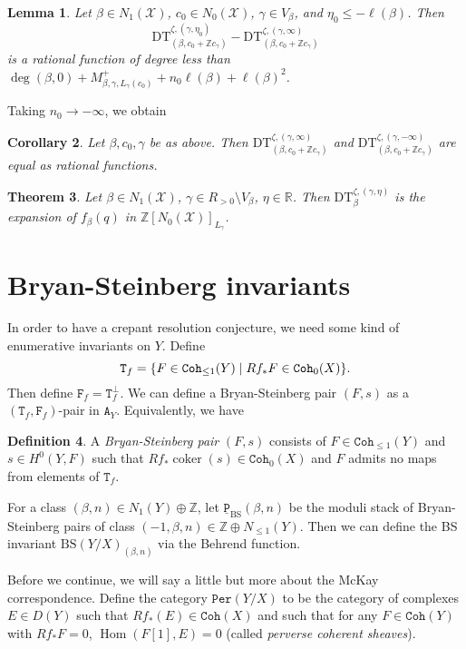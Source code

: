 \documentclass{amsart}
\newtheorem{thm}{Theorem}[section]
\newtheorem{cor}[thm]{Corollary}
\newtheorem{lem}[thm]{Lemma}
\theoremstyle{definition}
\newtheorem{defn}[thm]{Definition}
\theoremstyle{remark}
\theoremstyle{plain}
\theoremstyle{definition}
\theoremstyle{remark}
\newcommand{\R}{\mathbb{R}}
\newcommand{\Z}{\mathbb{Z}}
\newcommand{\mc}[1]{\mathcal{#1}}
\newcommand{\mr}[1]{\mathrm{#1}}
\newcommand{\on}[1]{\operatorname{#1}}
\newcommand{\mt}[1]{\mathtt{#1}}
\newcommand{\ul}[1]{\underline{#1}}
\newcommand{\1}{\mathbf{1}}
\newcommand{\2}{\mathbf{2}}
\newcommand{\3}{\mathbf{3}}
\DeclareMathOperator{\Hom}{Hom}
\begin{document}
\begin{lem}
    Let $\beta \in N_1(\mc{X})$, $c_0 \in N_0(\mc{X})$, $\gamma \in V_{\beta}$, and $\eta_0 \leq -\ell(\beta)$. Then
    \[ \mr{DT}_{(\beta, c_0 + \Z c_{\gamma})}^{\zeta, (\gamma, \eta_0)} - \mr{DT}_{(\beta, c_0 + \Z c_{\gamma})}^{\zeta, (\gamma, \infty)} \]
    is a rational function of degree less than $\deg(\beta, 0) + M_{\beta, \gamma, L_{\gamma}(c_0)}^+ + n_0 \ell(\beta) + \ell(\beta)^2$.
\end{lem}
Taking $n_0 \to -\infty$, we obtain
\begin{cor}
    Let $\beta, c_0, \gamma$ be as above. Then $\mr{DT}_{(\beta, c_0 + \Z c_{\gamma})}^{\zeta, (\gamma, \infty)}$ and $\mr{DT}_{(\beta, c_0 + \Z c_{\gamma})}^{\zeta, (\gamma, -\infty)}$ are equal as rational functions.
\end{cor}

\begin{thm}
    Let $\beta \in N_1(\mc{X})$, $\gamma \in R_{>0} \setminus V_{\beta}$, $\eta \in \R$. Then $\mr{DT}_{\beta}^{\zeta, (\gamma, \eta)}$ is the expansion of $f_{\beta}(q)$ in $\Z[N_0(\mc{X})]_{L_{\gamma}}$.
\end{thm}

\section{Bryan-Steinberg invariants}

In order to have a crepant resolution conjecture, we need some kind of enumerative invariants on $Y$. Define
\[ \mt{T}_f = \qty{F \in \mt{Coh}_{\leq 1}(Y) \mid R f_* F \in \mt{Coh}_0(X)}. \]
Then define $\mt{F}_f = \mt{T}_f^{\perp}$. We can define a Bryan-Steinberg pair $(F, s)$ as a $(\mt{T}_f, \mt{F}_f)$-pair in $\mt{A}_Y$. Equivalently, we have

\begin{defn}
    A \textit{Bryan-Steinberg pair} $(F, s)$ consists of $F \in \mt{Coh}_{\leq 1}(Y)$ and $s \in H^0(Y, F)$ such that $R f_* \on{coker}(s) \in \mt{Coh}_0(X)$ and $F$ admits no maps from elements of $\mt{T}_f$.
\end{defn}

For a class $(\beta, n) \in N_1(Y) \oplus \Z$, let $\mt{\ul{P}}_{\mr{BS}}(\beta, n)$ be the moduli stack of Bryan-Steinberg pairs of class $(-1, \beta, n) \in \Z \oplus N_{\leq 1}(Y)$. Then we can define the BS invariant $\mr{BS}(Y/X)_{(\beta, n)}$ via the Behrend function.

Before we continue, we will say a little but more about the McKay correspondence. Define the category $\mt{Per}(Y/X)$ to be the category of complexes $E \in D(Y)$ such that $R f_*(E) \in \mt{Coh}(X)$ and such that for any $F \in \mt{Coh}(Y)$ with $R f_* F = 0$, $\Hom(F[1], E) = 0$ (called \textit{perverse coherent sheaves}).
\end{document}
